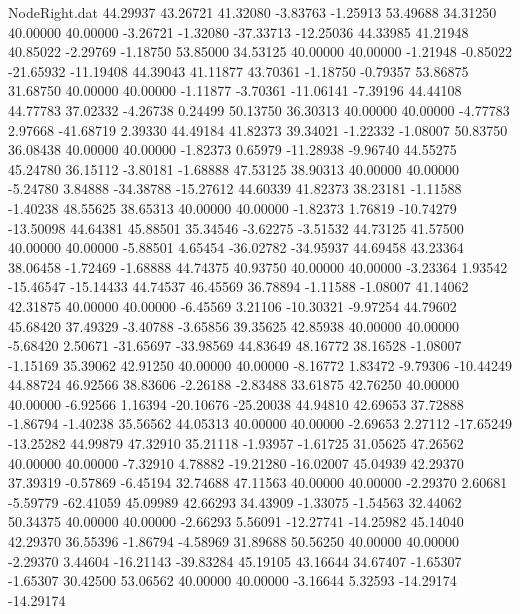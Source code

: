 \begin{filecontents}{NodeRight.dat}
  44.29937   43.26721   41.32080    -3.83763   -1.25913   53.49688   34.31250   40.00000   40.00000   -3.26721   -1.32080  -37.33713  -12.25036
  44.33985   41.21948   40.85022    -2.29769   -1.18750   53.85000   34.53125   40.00000   40.00000   -1.21948   -0.85022  -21.65932  -11.19408
  44.39043   41.11877   43.70361    -1.18750   -0.79357   53.86875   31.68750   40.00000   40.00000   -1.11877   -3.70361  -11.06141   -7.39196
  44.44108   44.77783   37.02332    -4.26738    0.24499   50.13750   36.30313   40.00000   40.00000   -4.77783    2.97668  -41.68719    2.39330
  44.49184   41.82373   39.34021    -1.22332   -1.08007   50.83750   36.08438   40.00000   40.00000   -1.82373    0.65979  -11.28938   -9.96740
  44.55275   45.24780   36.15112    -3.80181   -1.68888   47.53125   38.90313   40.00000   40.00000   -5.24780    3.84888  -34.38788  -15.27612
  44.60339   41.82373   38.23181    -1.11588   -1.40238   48.55625   38.65313   40.00000   40.00000   -1.82373    1.76819  -10.74279  -13.50098
  44.64381   45.88501   35.34546    -3.62275   -3.51532   44.73125   41.57500   40.00000   40.00000   -5.88501    4.65454  -36.02782  -34.95937
  44.69458   43.23364   38.06458    -1.72469   -1.68888   44.74375   40.93750   40.00000   40.00000   -3.23364    1.93542  -15.46547  -15.14433
  44.74537   46.45569   36.78894    -1.11588   -1.08007   41.14062   42.31875   40.00000   40.00000   -6.45569    3.21106  -10.30321   -9.97254
  44.79602   45.68420   37.49329    -3.40788   -3.65856   39.35625   42.85938   40.00000   40.00000   -5.68420    2.50671  -31.65697  -33.98569
  44.83649   48.16772   38.16528    -1.08007   -1.15169   35.39062   42.91250   40.00000   40.00000   -8.16772    1.83472   -9.79306  -10.44249
  44.88724   46.92566   38.83606    -2.26188   -2.83488   33.61875   42.76250   40.00000   40.00000   -6.92566    1.16394  -20.10676  -25.20038
  44.94810   42.69653   37.72888    -1.86794   -1.40238   35.56562   44.05313   40.00000   40.00000   -2.69653    2.27112  -17.65249  -13.25282
  44.99879   47.32910   35.21118    -1.93957   -1.61725   31.05625   47.26562   40.00000   40.00000   -7.32910    4.78882  -19.21280  -16.02007
  45.04939   42.29370   37.39319    -0.57869   -6.45194   32.74688   47.11563   40.00000   40.00000   -2.29370    2.60681   -5.59779  -62.41059
  45.09989   42.66293   34.43909    -1.33075   -1.54563   32.44062   50.34375   40.00000   40.00000   -2.66293    5.56091  -12.27741  -14.25982
  45.14040   42.29370   36.55396    -1.86794   -4.58969   31.89688   50.56250   40.00000   40.00000   -2.29370    3.44604  -16.21143  -39.83284
  45.19105   43.16644   34.67407    -1.65307   -1.65307   30.42500   53.06562   40.00000   40.00000   -3.16644    5.32593  -14.29174  -14.29174

\end{filecontents}
